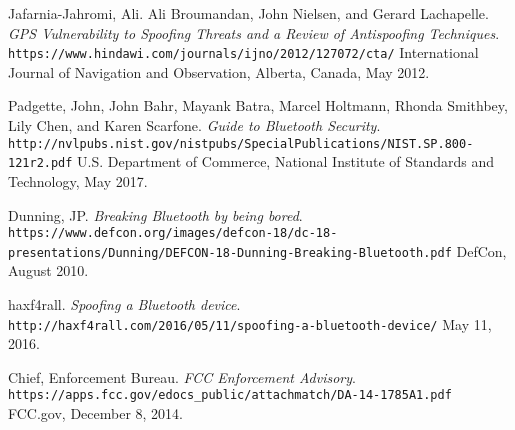 \documentclass{article}
\begin{document}
\begin{thebibliography}{9}


Jafarnia-Jahromi, Ali. Ali Broumandan, John Nielsen, and Gerard Lachapelle.
\textit{GPS Vulnerability to Spoofing Threats and a Review of Antispoofing Techniques}.
\\\texttt{https://www.hindawi.com/journals/ijno/2012/127072/cta/}
International Journal of Navigation and Observation, Alberta, Canada, May 2012.

Padgette, John, John Bahr, Mayank Batra, Marcel Holtmann, Rhonda Smithbey, Lily Chen, and Karen Scarfone.
\textit{Guide to Bluetooth Security}.
\\\texttt{http://nvlpubs.nist.gov/nistpubs/SpecialPublications/NIST.SP.800-121r2.pdf}
U.S. Department of Commerce, National Institute of Standards and Technology, May 2017.

Dunning, JP.
\textit{Breaking Bluetooth by being bored}.
\\\texttt{https://www.defcon.org/images/defcon-18/dc-18-presentations\-/Dunning/DEFCON-18-Dunning-Breaking-Bluetooth.pdf}
DefCon, August 2010.

haxf4rall.
\textit{Spoofing a Bluetooth device}.
\\\texttt{http://haxf4rall.com/2016/05/11/spoofing-a-bluetooth-device/}
May 11, 2016.

Chief, Enforcement Bureau.
\textit{FCC Enforcement Advisory}.
\\\texttt{https://apps.fcc.gov/edocs\_public/attachmatch/DA-14-1785A1.pdf}
FCC.gov, December 8, 2014.

\end{thebibliography}
\printglossaries

\end{document}

